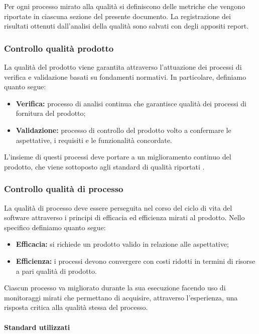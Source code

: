 	Per ogni processo mirato alla qualità si definiscono delle metriche che vengono riportate in ciascuna sezione del presente documento. 
	La registrazione dei risultati ottenuti dall'analisi della qualità sono salvati con degli appositi report.

	\subsubsection{Controllo qualità prodotto}

	La qualità del prodotto viene garantita attraverso l'attuazione dei processi di verifica e validazione basati su fondamenti normativi. In particolare, definiamo quanto segue:
	\begin{itemize}
		\item \textbf{Verifica:} processo di analisi continua che garantisce qualità dei processi di fornitura del prodotto;
		\item \textbf{Validazione:} processo di controllo del prodotto volto a confermare le aspettative, i requisiti e le funzionalità concordate.
	\end{itemize}

	L'insieme di questi processi deve portare a un miglioramento continuo del prodotto, che viene sottoposto agli standard di qualità riportati . 

	\subsubsection{Controllo qualità di processo}

	La qualità di processo deve essere perseguita nel corso del ciclo di vita del software attraverso i principi di efficacia ed efficienza mirati al prodotto. 
	Nello specifico definiamo quanto segue:
	\begin{itemize}
		\item \textbf{Efficacia:} si richiede un prodotto valido in relazione alle aspettative;
		\item \textbf{Efficienza:} i processi devono convergere con costi ridotti in termini di risorse a pari qualità di prodotto.
	\end{itemize}

	Ciascun processo va migliorato durante la sua esecuzione facendo uso di monitoraggi mirati che permettano di acquisire, attraverso l'esperienza, una risposta critica alla qualità stessa del processo. \\ 

	
	\paragraph{Standard utilizzati}

